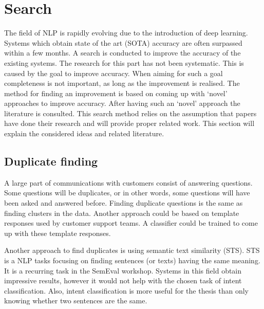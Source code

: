 \section{Search}
\label{sec:search}

The field of NLP is rapidly evolving due to the introduction of deep learning.
Systems which obtain state of the art (SOTA) accuracy are often surpassed within a few months.
A search is conducted to improve the accuracy of the existing systems.
The research for this part has not been systematic.
This is caused by the goal to improve accuracy.
When aiming for such a goal completeness is not important, as long as the improvement is realised.
The method for finding an improvement is based on coming up with `novel' approaches to improve accuracy.
After having such an `novel' approach the literature is consulted.
This search method relies on the assumption that papers have done their research and will provide proper related work.
This section will explain the considered ideas and related literature.

\subsection{Duplicate finding}
\label{subsec:duplicate_finding}
A large part of communications with customers consist of answering questions.
Some questions will be duplicates, or in other words, some questions will have been asked and answered before.
Finding duplicate questions is the same as finding clusters in the data.
Another approach could be based on template responses used by customer support teams.
A classifier could be trained to come up with these template responses.

Another approach to find duplicates is using semantic text similarity (STS).
STS is a NLP tasks focusing on finding sentences (or texts) having the same meaning.
It is a recurring task in the SemEval workshop.
Systems in this field obtain impressive results, however it would not help with the chosen task of intent classification.
Also, intent classification is more useful for the thesis than only knowing whether two sentences are the same.

